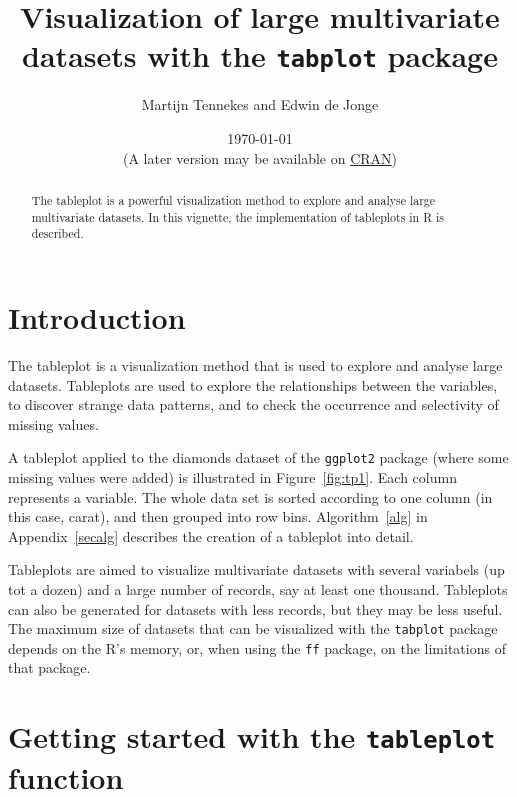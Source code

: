 \documentclass[11pt, fleqn, a4paper]{article}
\title{Visualization of large multivariate datasets with the {\tt tabplot} package}
\author{Martijn Tennekes and Edwin de Jonge}
\date{\today\\ (A later version may be available on \href{http://cran.r-project.org/package=tabplot}{CRAN})}
\begin{document}

\maketitle
\begin{abstract}

The tableplot is a powerful visualization method to explore and analyse large multivariate datasets. In this vignette, the implementation of tableplots in R is described. 


\end{abstract}

\maketitle


\section{Introduction}
The tableplot is a visualization method that is used to explore and analyse large datasets. Tableplots are used to explore the relationships between the variables, to discover strange data patterns, and to check the occurrence and selectivity of missing values. 

A tableplot applied to the diamonds dataset of the {\tt ggplot2} package (where some missing values were added) is illustrated in Figure~\ref{fig:tp1}. Each column represents a variable. The whole data set is sorted according to one column (in this case, carat), and then grouped into row bins. Algorithm~\ref{alg} in Appendix~\ref{secalg} describes the creation of a tableplot into detail.

Tableplots are aimed to visualize multivariate datasets with several variabels (up tot a dozen) and a large number of records, say at least one thousand. Tableplots can also be generated for datasets with less records, but they may be less useful. The maximum size of datasets that can be visualized with the {\tt tabplot} package depends on the R's memory, or, when using the {\tt ff} package, on the limitations of that package.

\section{Getting started with the {\tt tableplot} function}
\end{document}
